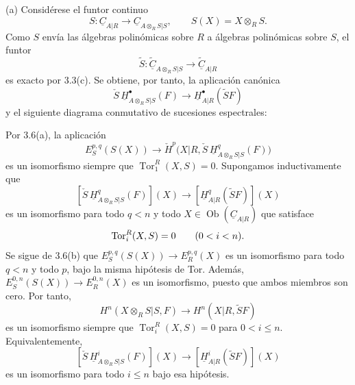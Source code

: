 (a) Considérese el funtor continuo
\[
 S:\underline C_{A|R}\longrightarrow
 \underline C_{A\otimes_RS|S},
 \qquad S(X)=X\otimes_RS.
\]
Como $S$ envía las álgebras polinómicas sobre $R$ a álgebras
polinómicas sobre $S$, el funtor
\[
 \widetilde S:\widetilde{\underline C}_{A\otimes_RS|S}
 \longrightarrow\widetilde{\underline C}_{A|R}
\]
es exacto por 3.3(c). Se obtiene, por tanto, la aplicación canónica
\[
 \check S\,\underline H^{\bullet}_{A\otimes_RS|S}(F)
 \longrightarrow
 \underline H^{\bullet}_{A|R}(\widetilde SF)
\]
y el siguiente diagrama conmutativo de sucesiones espectrales:
\begin{center}
\small
{}
\end{center}


Por 3.6(a), la aplicación
\[
 E_S^{p,q}(S(X))\longrightarrow
 \check H^p\bigl(X|R,
 \check S\,\underline H^q_{A\otimes_RS|S}(F)\bigr)
\]
es un isomorfismo siempre que
$\operatorname{Tor}_1^R(X,S)=0$. Supongamos inductivamente que
\[
 [\check S\,\underline H^q_{A\otimes_RS|S}(F)](X)
 \longrightarrow
 [\underline H^q_{A|R}(\widetilde SF)](X)
\]
es un isomorfismo para todo $q<n$ y todo
$X\in\operatorname{Ob}(\underline C_{A|R})$ que satisface
\[
 \operatorname{Tor}_i^R(X,S)=0\qquad(0<i< n).
\]
Se sigue de 3.6(b) que
$E_S^{p,q}(S(X))\longrightarrow E_R^{p,q}(X)$ es un isomorfismo
para todo $q<n$ y todo $p$, bajo la misma hipótesis de Tor. Además,
$E_S^{0,n}(S(X))\longrightarrow E_R^{0,n}(X)$ es un isomorfismo,
puesto que ambos miembros son cero. Por tanto,
\[
 H^n(X\otimes_RS|S,F)
 \longrightarrow H^n(X|R,\widetilde SF)
\]
es un isomorfismo siempre que
$\operatorname{Tor}_i^R(X,S)=0$ para $0<i\leq n$. Equivalentemente,
\[
 [\check S\,\underline H^i_{A\otimes_RS|S}(F)](X)
 \longrightarrow
 [\underline H^i_{A|R}(\widetilde SF)](X)
\]
es un isomorfismo para todo $i\leq n$ bajo esa hipótesis.

